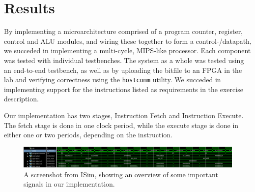 \chapter{Results}

By implementing a microarchitecture comprised of a program counter, register, control and ALU modules, and wiring these together to form a control-/datapath, we succeded in implementing a multi-cycle, MIPS-like processor.
Each component was tested with individual testbenches.
The system as a whole was tested using an end-to-end testbench, as well as by uploading the bitfile to an FPGA in the lab and verifying correctness using the \texttt{hostcomm} utility.
We succeded in implementing support for the instructions listed as requirements in the exercise description.

Our implementation has two stages, Instruction Fetch and Instruction Execute.
The fetch stage is done in one clock period, while the execute stage is done in either one or two periods, depending on the instruction.

\begin{figure}[h!]
    \includegraphics[width=\linewidth]{img/overview_sim.png}
    \caption{A screenshot from ISim, showing an overview of some important signals in our implementation.}
    \label{fig:waves}
\end{figure}
